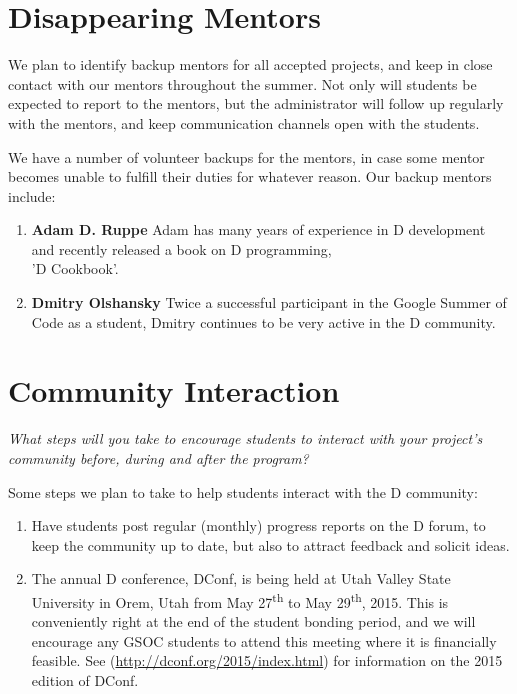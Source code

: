 \documentclass[	DIV=calc,%
							paper=a4,%
							fontsize=11pt,%
							twocolumn]{scrartcl}	 					%
\begin{document}
\section{Disappearing Mentors}

We plan to identify backup mentors for all accepted projects,
and keep in close contact with our mentors throughout the
summer.  Not only will students be expected to report to the mentors,
but the administrator will follow up regularly with the mentors, and
keep communication channels open with the students.

We have a number of volunteer backups for the mentors, in case
some mentor becomes unable to fulfill their duties for whatever
reason.  Our backup mentors include:

\begin{enumerate}
     \item \textbf{Adam D. Ruppe}  Adam has many years of experience in
     D development and recently released a book on D programming, \\
     'D Cookbook'.
     \item \textbf{Dmitry Olshansky}  Twice a successful participant
     in the Google Summer of Code as a student, Dmitry continues to be 
     very active in the D community. 
\end{enumerate}

\section{Community Interaction}
\emph{What steps will you take to encourage students to interact 
with your project's community before, during and after 
the program?}

Some steps we plan to take to help students interact with
the D community:

\begin{enumerate}
\item Have students post regular (monthly) progress reports
on the D forum, to keep the community up to date, but also
to attract feedback and solicit ideas.
\item The annual D conference, DConf, is being held at Utah
Valley State University in Orem, Utah from May 27\textsuperscript{th}
to May 29\textsuperscript{th}, 2015. This is conveniently right at 
the end of the student bonding period, and we will encourage any
GSOC students to attend this meeting where it is financially 
feasible. See (\url{http://dconf.org/2015/index.html}) for information on
the 2015 edition of DConf.
\end{enumerate}
\end{document}
